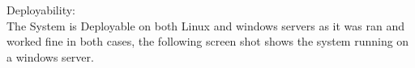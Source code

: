 \item {Deployability:}\\

The System is Deployable on both Linux and windows servers as it was ran and worked fine in both cases, the following screen shot shows the system running on a windows server.